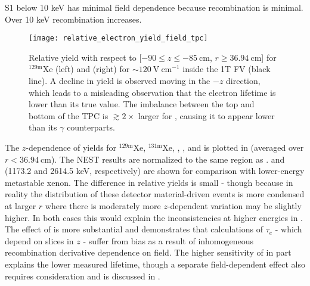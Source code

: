 S1 below 10 keV has minimal field dependence because recombination is minimal.  Over 10 keV recombination increases.

\begin{figure}
\centering
\texttt{[image: relative\_electron\_yield\_field\_tpc]}
\caption{Relative \electron yield with respect to [$-90 \leq z \leq -85\ \mathrm{cm}$, $r \geq 36.94\ \mathrm{cm}$] for
$\mathrm{^{129m}Xe}$ (left) and  (right) for ${\sim}120\ \mathrm{V\ cm^{-1}}$ inside the 1T FV (black line).  A decline in
yield is
observed moving in the $-z$ direction, which leads to a misleading observation that the electron lifetime is lower than its true
value.  The imbalance between the top
and bottom of the TPC is $\gtrsim 2\times$ larger for , causing it to appear lower than its $\gamma$ counterparts.}
\label{fig:electron_lifetimes_rn222_vs_kr83m_field_tpc}
\end{figure}

The $z$-dependence of \electron yields for $\mathrm{^{129m}Xe}$, $\mathrm{^{131m}Xe}$, , , and  is
plotted in  (averaged over $r < 36.94\ \mathrm{cm}$).  The NEST results are
normalized to the same region as .   and  (1173.2 and
2614.5 keV, respectively) are shown for comparison with lower-energy metastable xenon.  The difference in relative yields is
small - though because in reality the distribution of these detector material-driven events is more condensed at larger $r$ where there
is moderately more $z$-dependent variation may be slightly higher.  In both cases this
would explain the inconsistencies at higher energies in .  The
effect of  is more substantial and demonstrates that calculations of $\tau_e$ - which depend on slices in $z$ - suffer from
bias as a result of inhomogeneous recombination derivative dependence on field.  The higher sensitivity of \alphadecays in part explains
the lower measured lifetime, though a separate field-dependent effect also requires consideration and is discussed in
.

